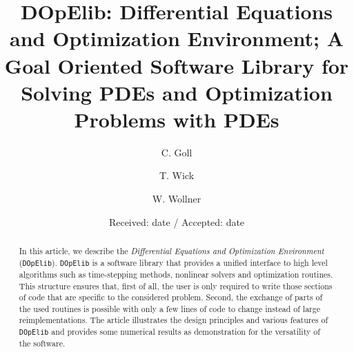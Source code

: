 \documentclass[smallextended]{svjour3}       %
\numberwithin{equation}{section}
\newcommand{\dope}{\texttt{DOpElib}}
\begin{document}
\title{DOpElib: Differential Equations and Optimization Environment; A Goal Oriented Software Library for Solving PDEs and Optimization Problems with PDEs}



\author{C. Goll \and T. Wick \and W. Wollner}



\date{Received: date / Accepted: date}


\maketitle

\begin{abstract}
In this article, we describe the  
\textit{Differential Equations and Optimization Environment} (\dope{}).
\dope{} is a software library that provides a unified interface 
to high level algorithms such as time-stepping methods, nonlinear solvers and 
optimization routines. This structure ensures 
that, first of all, the user is only required to write those sections of code 
that are specific to 
the considered problem. Second, the exchange of parts of the used routines is possible 
with only a few lines of code to change instead of large reimplementations.
The article illustrates the design principles and various features
of \dope{} and provides some 
numerical results as demonstration for the versatility of the software.
\end{abstract}
\end{document}
